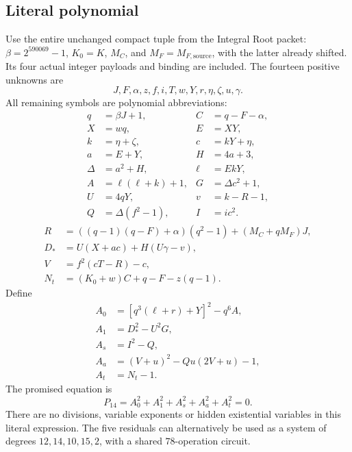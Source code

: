 \subsection{Literal polynomial}
Use the entire unchanged compact tuple from the Integral Root packet:
$\beta=2^{590069}-1$, $K_0=K$, $M_C$, and $M_F=M_{F,\mathrm{source}}$,
with the latter already shifted. Its four actual integer payloads and binding
are included. The fourteen positive unknowns are
\[
 J,F,\alpha,z,f,i,T,w,Y,r,\eta,\zeta,u,\gamma.
\]
All remaining symbols are polynomial abbreviations:
\begin{align*}
 q&=\beta J+1,& C&=q-F-\alpha,\\
 X&=wq,& E&=XY,\\
 k&=\eta+\zeta,& c&=kY+\eta,\\
 a&=E+Y,& H&=4a+3,\\
 \Delta&=a^2+H,& \ell&=EkY,\\
 A&=\ell(\ell+k)+1,& G&=\Delta c^2+1,\\
 U&=4qY,& v&=k-R-1,\\
 Q&=\Delta(f^2-1),& I&=ic^2.
\end{align*}
\begin{align*}
 R&=((q-1)(q-F)+\alpha)(q^2-1)+(M_C+qM_F)J,\\
 D_*&=U(X+ac)+H(U\gamma-v),\\
 V&=f^2(cT-R)-c,\\
 N_t&=(K_0+w)C+q-F-z(q-1).
\end{align*}
Define
\begin{align*}
 A_0&=[q^3(\ell+r)+Y]^2-q^6 A,\\
 A_1&=D_*^2-U^2G,\\
 A_s&=I^2-Q,\\
 A_a&=(V+u)^2-Qu(2V+u)-1,\\
 A_t&=N_t-1.
\end{align*}
The promised equation is
\[
 \boxed{P_{14}=A_0^2+A_1^2+A_s^2+A_a^2+A_t^2=0.}
\]
There are no divisions, variable exponents or hidden existential variables
in this literal expression. The five residuals can alternatively be used
as a system of degrees $12,14,10,15,2$, with a shared $78$-operation circuit.

